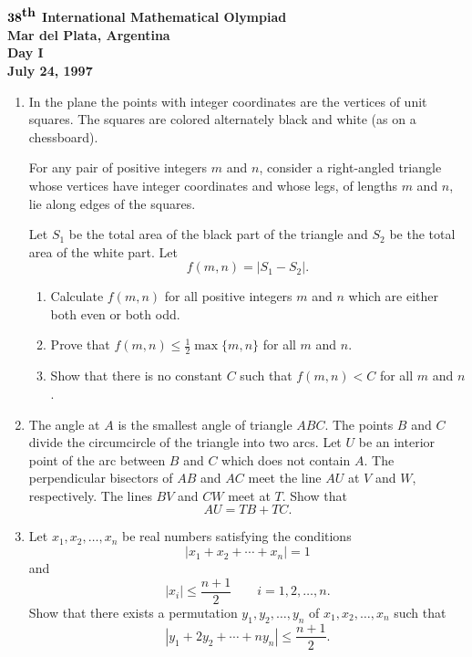 \documentclass[12pt]{article}
\begin{document}
\begin{center}
${\bf 38}^{\mbox{\bf th}}$ {\bf International
Mathematical Olympiad} \\[.1in]
{\bf Mar del Plata, Argentina} \\ [.05in]
{\bf Day I}\\[.05in]
{\bf July 24, 1997}
\end{center}

\vspace*{.3in}

\begin{enumerate}
\item %
In the plane the points with integer coordinates are the vertices of
unit squares. The
squares are colored alternately black and white (as on a chessboard). 

For any pair of positive integers $m$ and $n$, consider a right-angled triangle
whose
vertices have integer coordinates and whose legs, of lengths $m$ and $n$,
lie along edges of the squares. 

Let $S_1$ be the total area of the black part of the triangle and
$S_2$ be the total area of the
white part. Let
\[
f(m,n) = |S_1 - S_2|.
\]
\begin{enumerate}
\item
Calculate $f(m,n)$ for all positive integers $m$ and $n$ which are either
both even or both odd. 

\item
Prove that $f(m,n) \leq \frac{1}{2} \max\{m,n\}$ for all $m$ and $n$. 

\item
Show that there is no constant $C$ such that $f(m,n) < C$ for all $m$ and $n$. 
\end{enumerate}

\item %

The angle at $A$ is the smallest angle of triangle $ABC$.
The points $B$ and $C$ divide the circumcircle of the triangle into
two arcs. Let $U$ be an interior point of the arc between $B$ and $C$
which does not contain $A$. The perpendicular bisectors of $AB$ and
$AC$ meet the line $AU$ at $V$ and $W$, respectively. The lines $BV$
and $CW$ meet at $T$. Show that
\[
AU = TB + TC.
\]

\item %
Let $x_1, x_2, \dots, x_n$ be real numbers satisfying the conditions
\[
\left| x_1 + x_2 + \cdots + x_n \right| = 1
\]
and
\[
\left| x_i \right| \leq \frac{n+1}{2} \qquad i = 1, 2, \dots, n.
\]
Show that there exists a permutation $y_1, y_2, \dots, y_n$ of $x_1,
x_2, \dots, x_n$ such that
\[
\left| y_1 + 2y_2 + \cdots + ny_n \right| \leq \frac{n+1}{2}.
\]

\end{enumerate}
\end{document}
